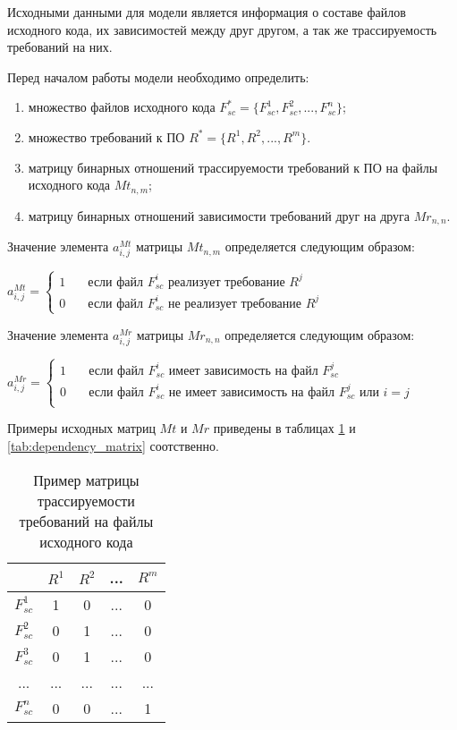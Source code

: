 Исходными данными для модели является информация о составе файлов исходного кода, их зависимостей между друг другом, а так же трассируемость требований на них.

Перед началом работы модели необходимо определить:
\begin{enumerate}
    \item множество файлов исходного кода $F_{sc}^* = \{F_{sc}^1, F_{sc}^2, ..., F_{sc}^{n}\}$;
    \item множество требований к ПО $R^* = \{R^1, R^2, ..., R^m\}$.
    \item матрицу бинарных отношений трассируемости требований к ПО на файлы исходного кода $Mt_{n, m}$;
    \item матрицу бинарных отношений зависимости требований друг на друга $Mr_{n,n}$.
\end{enumerate}

Значение элемента $a_{i,j}^{Mt}$ матрицы $Mt_{n,m}$ определяется следующим образом:

$
a_{i,j}^{Mt} = \begin{cases}
    1  & \quad \text{если файл } F_{sc}^i \text{ реализует требование } R^j\\
    0  & \quad \text{если файл } F_{sc}^i \text{ не реализует требование } R^j
  \end{cases}
$

Значение элемента $a_{i,j}^{Mr}$ матрицы $Mr_{n,n}$ определяется следующим образом:

$
a_{i,j}^{Mr} = \begin{cases}
    1  & \quad \text{если файл } F_{sc}^i \text{ имеет зависимость на файл } F_{sc}^j\\
    0  & \quad \text{если файл } F_{sc}^i \text{ не имеет зависимость на файл } F_{sc}^j \text{ или } i = j\\
  \end{cases}
$

Примеры исходных матриц $Mt$ и $Mr$ приведены в таблицах \ref{tab:requirements_traceability_matrix} и \ref{tab:dependency_matrix} соотственно.
\newpage
\begin{longtable}{|c|c|c|c|c|}
\caption{Пример матрицы трассируемости требований на файлы исходного кода}
\label{tab:requirements_traceability_matrix}\\
\hline
& \cellcolor{ash-grey} $R^1$ 
& \cellcolor{ash-grey} $R^2$ 
& ... 
& \cellcolor{ash-grey} $R^m$ \\
\hline
\cellcolor{platinum} $F_{sc}^1$ & \cellcolor{light-colar} 1 & 0 & ... & 0 \\
\hline
\cellcolor{platinum} $F_{sc}^2$ & 0 & \cellcolor{light-orange} 1 & ... & 0 \\
\hline
\cellcolor{platinum} $F_{sc}^3$ & 0 & \cellcolor{crayola} 1 & ... & 0 \\
\hline
... & ... & ... & ... & ... \\
\hline
\cellcolor{platinum} $F_{sc}^n$ & 0 & 0 & ... & \cellcolor{light-green} 1 \\
\hline
\end{longtable}


